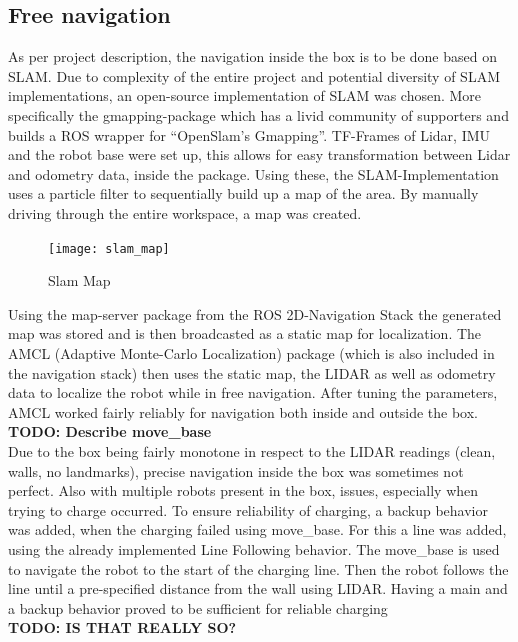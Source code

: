     \subsection{Free navigation} %
    \label{sub:mr_free_navigation}
    
    As per project description, the navigation inside the box is to be done based on SLAM. 
    Due to complexity of the entire project and potential diversity of SLAM implementations, an open-source implementation of SLAM was chosen. 
    More specifically the gmapping-package \cite{gmapping} which has a livid community of supporters and builds a ROS wrapper for “OpenSlam's Gmapping”\cite{openslam}. 
    TF-Frames of Lidar, IMU and the robot base were set up, this allows for easy transformation between Lidar and odometry data, inside the package. 
    Using these, the SLAM-Implementation uses a particle filter to sequentially build up a map of the area. 
    By manually driving through the entire workspace, a map was created. 
    \begin{figure}[H]
        \centering
        \texttt{[image: slam\_map]}
        \caption{Slam Map}
        \label{fig:slam_map}
    \end{figure}
    Using the map-server package from the ROS 2D-Navigation Stack \cite{navigation_stack} the generated map was stored and is then broadcasted as a static map for localization. 
    The AMCL (Adaptive Monte-Carlo Localization) package (which is also included in the navigation stack) then uses the static map, the LIDAR as well as odometry data to localize the robot while in free navigation. 
    After tuning the parameters, AMCL worked fairly reliably for navigation both inside and outside the box.\\
    \textbf{TODO: Describe move{\_}base}\\
    Due to the box being fairly monotone in respect to the LIDAR readings (clean, walls, no landmarks), precise navigation inside the box was sometimes not perfect. 
    Also with multiple robots present in the box, issues, especially when trying to charge occurred. 
    To ensure reliability of charging, a backup behavior was added, when the charging failed using move{\_}base. 
    For this a line was added, using the already implemented Line Following behavior. 
    The move{\_}base is used to navigate the robot to the start of the charging line. 
    Then the robot follows the line until a pre-specified distance from the wall using LIDAR. 
    Having a main and a backup behavior proved to be sufficient for reliable charging\\
    \textbf{TODO: IS THAT REALLY SO?}


